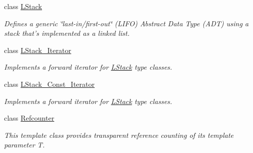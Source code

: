 \begin{DoxyCompactItemize}
class \hyperlink{classMadara_1_1Utility_1_1LStack}{LStack}
\begin{DoxyCompactList}\small\item\em Defines a generic \char`\"{}last-\/in/first-\/out\char`\"{} (LIFO) Abstract Data Type (ADT) using a stack that's implemented as a linked list. \item\end{DoxyCompactList}\item 
class \hyperlink{classMadara_1_1Utility_1_1LStack__Iterator}{LStack\_\-Iterator}
\begin{DoxyCompactList}\small\item\em Implements a forward iterator for \hyperlink{classMadara_1_1Utility_1_1LStack}{LStack} type classes. \item\end{DoxyCompactList}\item 
class \hyperlink{classMadara_1_1Utility_1_1LStack__Const__Iterator}{LStack\_\-Const\_\-Iterator}
\begin{DoxyCompactList}\small\item\em Implements a forward iterator for \hyperlink{classMadara_1_1Utility_1_1LStack}{LStack} type classes. \item\end{DoxyCompactList}\item 
class \hyperlink{classMadara_1_1Utility_1_1Refcounter}{Refcounter}
\begin{DoxyCompactList}\small\item\em This template class provides transparent reference counting of its template parameter {\itshape T\/}. \item\end{DoxyCompactList}\end{DoxyCompactItemize}
